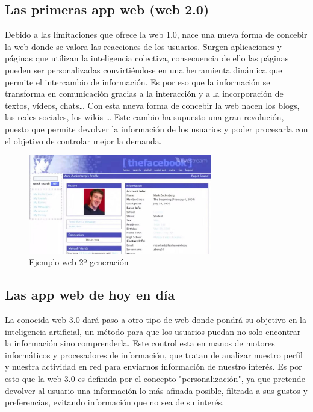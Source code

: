 \subsection{Las primeras app web (web 2.0)}

Debido a las limitaciones que ofrece la web 1.0, nace una nueva forma de concebir la web donde se valora las reacciones de los usuarios. Surgen aplicaciones y páginas que utilizan la inteligencia colectiva, consecuencia de ello las páginas pueden ser personalizadas convirtiéndose en una herramienta dinámica que permite el intercambio de información. Es por eso que la información se transforma en comunicación gracias a la interacción y a la incorporación de textos, vídeos, chats… Con esta nueva forma de concebir la web nacen los blogs, las redes sociales, los wikis … Este cambio ha supuesto una gran revolución, puesto que permite devolver la información de los usuarios y poder procesarla con el objetivo de controlar mejor la demanda. 


\begin{figure}[H]
    \centering
    \includegraphics[width=80mm]{memoria/LaTeX/img/introduccion/web2.jpeg}
    \caption{Ejemplo web 2º generación}
\end{figure}
\subsection{Las app web de hoy en día}

La conocida web 3.0 dará paso a otro tipo de web donde pondrá su objetivo en la inteligencia artificial, un método para que los usuarios puedan no solo encontrar la información sino comprenderla. Este control esta en manos de motores informáticos y procesadores de información, que tratan de analizar nuestro perfil y nuestra actividad en red para enviarnos información de nuestro interés. 
Es por esto que la web 3.0 es definida por el concepto "personalización", ya que pretende devolver al usuario una información lo más afinada posible, filtrada a sus gustos y preferencias, evitando información que no sea de su interés.

